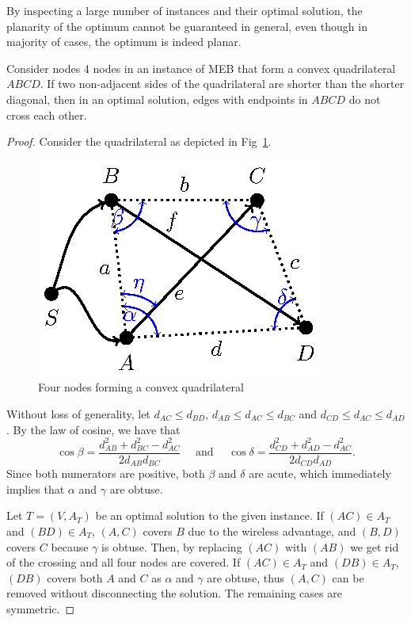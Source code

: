 By inspecting a large number of instances and their optimal solution, the planarity of the optimum cannot be guaranteed in general, even though in majority of cases, the optimum is indeed planar.
\begin{proposition}\label{prop:mebplan}
Consider nodes 4 nodes in an instance of MEB that form a convex quadrilateral $ABCD$.
If two non-adjacent sides of the quadrilateral are shorter than the shorter diagonal, then in an optimal solution, edges with endpoints in $ABCD$ do not cross each other.
\end{proposition}
\begin{proof}
Consider the quadrilateral as depicted in Fig~\ref{fig:quad}. 
\begin{figure}[htb!]
  \centering
  \includegraphics[scale=1.4]{figurer/quadrilat.eps}
  \caption{Four nodes forming a convex quadrilateral}
  \label{fig:quad}
\end{figure}
Without loss of generality, let $d_{AC}\leq d_{BD}$, $d_{AB}\leq d_{AC}\leq d_{BC}$ and $d_{CD}\leq d_{AC}\leq d_{AD}$.
By the law of cosine, we have that 
$$
\cos{\beta}=\frac{d^2_{AB} + d^2_{BC} - d^2_{AC}}{2d_{AB}d_{BC}} \text{~~~ and ~~~}\cos{\delta}=\frac{d^2_{CD} + d^2_{AD} - d^2_{AC}}{2d_{CD}d_{AD}}.
$$
Since both numerators are positive, both $\beta$ and $\delta$ are acute, which immediately implies that $\alpha $ and $\gamma$ are obtuse.

Let $T=(V,A_T)$ be an optimal solution to the given instance.
If $(AC)\in A_T$ and $(BD)\in A_T$, $(A,C)$ covers $B$ due to the wireless advantage, and $(B,D)$ covers $C$ because $\gamma$ is obtuse.
Then, by replacing $(AC)$ with $(AB)$ we get rid of the crossing and all four nodes are covered.
If $(AC)\in A_T$ and $(DB)\in A_T$, $(DB)$ covers both $A$ and $C$ as $\alpha$ and $\gamma$ are obtuse, thus $(A,C)$ can be removed without disconnecting the solution.
The remaining cases are symmetric.
\end{proof}
